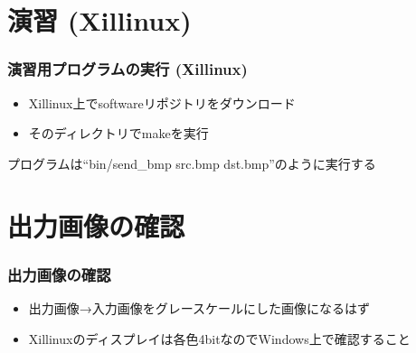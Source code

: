 ﻿\documentclass[dvipdfmx]{beamer}
\begin{document}
\section{演習 (Xillinux)}
\begin{frame}
	\frametitle{演習用プログラムの実行 (Xillinux)}
	\begin{itemize}
		\item
			Xillinux上でsoftwareリポジトリをダウンロード
		\item
			そのディレクトリでmakeを実行
	\end{itemize}
	プログラムは``bin/send\_bmp src.bmp dst.bmp''のように実行する
\end{frame}

\section{出力画像の確認}
\begin{frame}
	\frametitle{出力画像の確認}
	\begin{itemize}
		\item
			出力画像→入力画像をグレースケールにした画像になるはず
			\vfill
		\item
			Xillinuxのディスプレイは各色4bitなのでWindows上で確認すること
	\end{itemize}
\end{frame}
\end{document}
